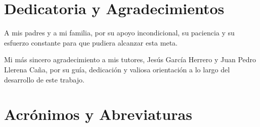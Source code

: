 \documentclass[12pt]{report} %
\begin{document}
\chapter*{Dedicatoria y Agradecimientos} %

\setcounter{page}{5}

\vspace{1.5cm}

\begin{itshape}
A mis padres y a mi familia, por su apoyo incondicional, su paciencia y su esfuerzo constante para que pudiera alcanzar esta meta.

Mi más sincero agradecimiento a mis tutores, Jesús García Herrero y Juan Pedro Llerena Caña, por su guía, dedicación y valiosa orientación a lo largo del desarrollo de este trabajo.
\end{itshape}
		
\vfill
	
	\newpage %
	\thispagestyle{empty}
	\mbox{}
	


\tableofcontents
\thispagestyle{fancy}

\newpage %
\thispagestyle{empty}
\mbox{}

\listoffigures
\thispagestyle{fancy}

\newpage %
\thispagestyle{empty}
\mbox{}

\listoftables
\thispagestyle{fancy}

\newpage %
\thispagestyle{empty}
\mbox{}

\chapter*{Acrónimos y Abreviaturas}
\thispagestyle{fancy}
\end{document}
